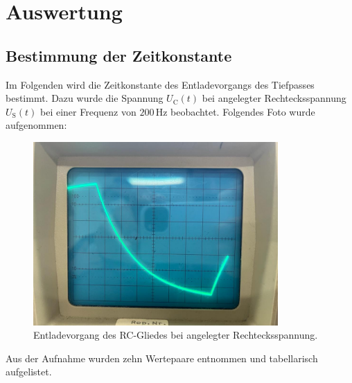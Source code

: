 \section{Auswertung} 

\subsection{Bestimmung der Zeitkonstante}

\begin{flushleft}
    Im Folgenden wird die Zeitkonstante des Entladevorgangs des Tiefpasses bestimmt.
    Dazu wurde die Spannung $U_{\text{C}}(t)$ bei angelegter Rechtecksspannung $U_{\text{S}}(t)$ bei einer Frequenz von $200\,\unit{\hertz}$ beobachtet.
    Folgendes Foto wurde aufgenommen: 
\end{flushleft}

\begin{figure} [H]
    \centering
    \includegraphics[height=70mm]{bilder/1.jpeg}
    \caption{Entladevorgang des RC-Gliedes bei angelegter Rechtecksspannung.\label{Abbildung3} }
\end{figure}

\begin{flushleft}
    Aus der Aufnahme wurden zehn Wertepaare entnommen und tabellarisch aufgelistet.
\end{flushleft}

